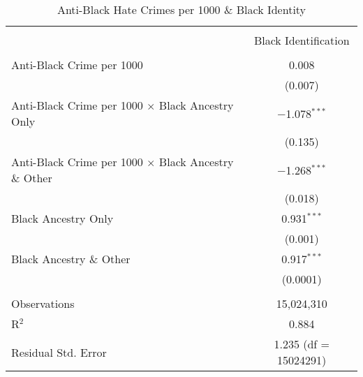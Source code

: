\documentclass{article}
\begin{document}
        \begin{table}[!htbp] \centering
          \caption{Anti-Black Hate Crimes per 1000 \& Black Identity}
          \begin{tabular}{@{\extracolsep{5pt}}lc} 
            \\[-1.8ex]\hline 
            \hline \\[-1.8ex] 
             & \multicolumn{1}{c}{\small{Black Identification}} \\ 
            \hline \\[-1.8ex] 
             Anti-Black Crime per 1000 & 0.008 \\
              & \small{(0.007)} \\     
             Anti-Black Crime per 1000 $\times$ Black Ancestry Only & $-$1.078$^{***}$ \\ 
              & \small{(0.135)} \\ 
             Anti-Black Crime per 1000 $\times$ Black Ancestry \& Other & $-$1.268$^{***}$ \\ 
              & \small{(0.018)} \\           
             Black Ancestry Only & 0.931$^{***}$ \\ 
              & \small{(0.001)} \\ 
             Black Ancestry \& Other & 0.917$^{***}$ \\ 
              & \small{(0.0001)} \\ 
            \hline \\[-1.8ex] 
            Observations & 15,024,310 \\ 
            R$^{2}$ & 0.884 \\ 
            Residual Std. Error & 1.235 (df = 15024291) \\ 
        \end{tabular} 
        \label{tab:vio_anti_blk1000_yr}
        \end{table} 
        
\end{document}
